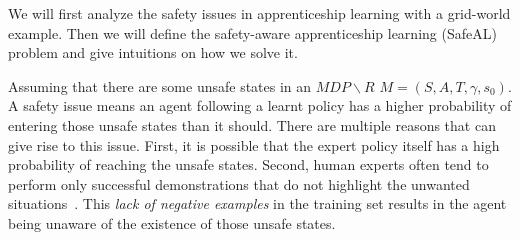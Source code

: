 We will first analyze the safety issues in apprenticeship learning with a grid-world example. Then we will define the safety-aware apprenticeship learning (SafeAL) problem and give intuitions on how we solve it. 


 

Assuming that there are some unsafe states
in an $MDP\backslash R$ $M = (S, A, T, \gamma, s_0)$. 
A safety issue means an agent following a learnt policy has a higher probability of entering those unsafe states than it should. There are multiple reasons that can give rise to this issue. First, it is possible that the expert policy itself has a high probability of reaching the unsafe states. Second, human experts often tend to perform only successful demonstrations that do not highlight the unwanted situations~\cite{shiarlis2016inverse}. This {\it lack of negative examples} in the training set results in the agent being unaware of the existence of those unsafe states.

